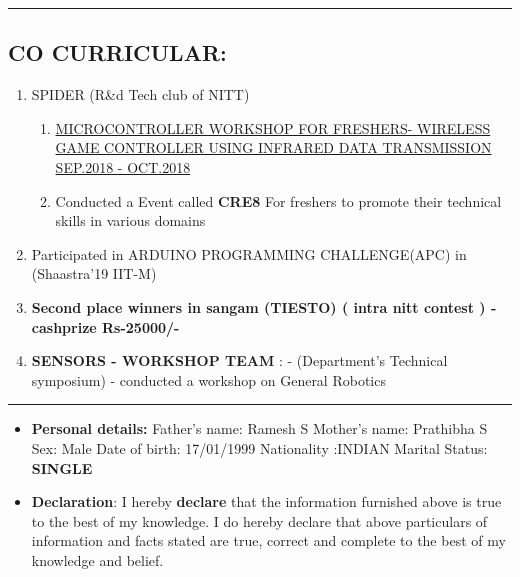 \documentclass[10pts]{report}
\newcommand{\tab}[1]{\hspace{.2667\textwidth}\rlap{#1}}
\begin{document}
\par\noindent\rule{\textwidth}{0.1pt}
\begin{flushleft}
         \section*{CO CURRICULAR:}
              \begin{enumerate}
                               \item SPIDER (R\&d Tech club of  NITT)
                                         
                                          \begin{enumerate}
                                                    \item{\href{https://www.youtube.com/watch?v=C6ktntQEmCk}{ MICROCONTROLLER WORKSHOP FOR FRESHERS- WIRELESS GAME CONTROLLER USING INFRARED DATA TRANSMISSION SEP.2018 - OCT.2018}}
                                                    \item Conducted a Event called \textbf{CRE8}  For freshers  to promote their technical skills in various domains
                                           \end{enumerate} 
                                 \item Participated in ARDUINO PROGRAMMING CHALLENGE(APC) in (Shaastra'19 IIT-M)
                                 \item \textbf{Second place winners in sangam  (TIESTO) ( intra nitt contest ) -cashprize Rs-25000/-}
                                 \item \textbf{SENSORS - WORKSHOP TEAM } : - (Department's Technical symposium) - conducted a workshop on General Robotics                                
                      
              \end{enumerate}                                  
\end{flushleft}


\par\noindent\rule{\textwidth}{0.1pt}
\begin{flushleft}
          
            \begin{itemize}
                     \item {\textbf{Personal details:}}  Father's name: Ramesh S
                      \hfill{}   Mother's name: Prathibha S  
                    \hfill{}  Sex: Male
                       \tab{}Date of birth: 17/01/1999
                       \hfill{}Nationality :INDIAN
                      \hfill{}Marital Status: \textbf{SINGLE}
\item  \textbf{Declaration}:
I hereby \textbf{declare} that the information furnished above is true to the best of my knowledge. I do hereby declare that above particulars of information and facts stated are true, correct and complete to the best of my knowledge and belief.

       \end{itemize}
                                               


     
\end{flushleft}
\end{document}
